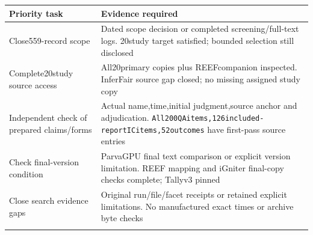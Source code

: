 \begin{longtable}{>{\raggedright\arraybackslash}p{}>{\raggedright\arraybackslash}p{}}
\toprule
\textbf{Priority task} & \textbf{Evidence required}\\\midrule\endhead
Close559-record scope & Dated scope decision or completed screening/full-text logs. 20study target satisfied; bounded selection still disclosed\\\addlinespace
Complete20study source access & All20primary copies plus REEFcompanion inspected. InferFair source gap closed; no missing assigned study copy\\\addlinespace
Independent check of prepared claims/forms & Actual name,time,initial judgment,source anchor and adjudication. \nolinkurl{All200QAitems,126included-reportICitems,52outcomes} have first-pass source entries\\\addlinespace
Check final-version condition & ParvaGPU final text comparison or explicit version limitation. REEF mapping and iGniter final-copy checks complete; Tallyv3 pinned\\\addlinespace
Close search evidence gaps & Original run/file/facet receipts or retained explicit limitations. No manufactured exact times or archive byte checks\\\addlinespace
\bottomrule\end{longtable}